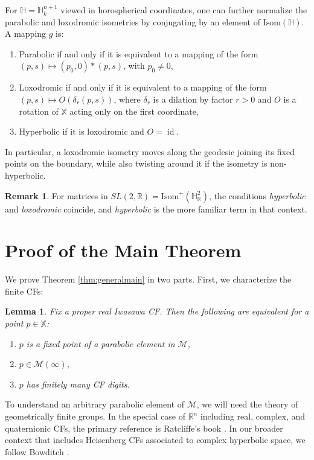 \documentclass[reqno,10pt]{amsart}
\newcommand{\Hyp}{\mathbb{H}}
\newcommand{\R}{\mathbb{R}}
\newcommand{\id}{\operatorname{id}}
\newcommand{\X}{\mathbb X}
\newcommand{\Isom}{\text{Isom}}
\newtheorem{lemma}[thm]{Lemma}
\numberwithin{thm}{section}
\theoremstyle{definition}
\theoremstyle{definition}
\newtheorem{remark}[thm]{Remark}
\numberwithin{equation}{section}
\newcommand{\Mod}{\mathcal M}
\begin{document}
For $\Hyp=\Hyp^{n+1}_k$ viewed in horospherical coordinates, one  can further normalize the parabolic and loxodromic isometries by conjugating by an element of $\Isom(\Hyp)$. A mapping $g$ is:
\begin{enumerate}
\item Parabolic if and only if it is equivalent to a mapping of the form $(p,s)\mapsto (p_0,0)*(p,s)$, with $p_0\neq 0$,
\item Loxodromic if and only if it is equivalent to a mapping of the form $(p,s)\mapsto O(\delta_r(p,s))$, where $\delta_r$ is a dilation by factor $r>0$ and $O$ is a rotation of $\X$ acting only on the first coordinate,
\item Hyperbolic if it is loxodromic and $O=\id$.
\end{enumerate}
In particular, a loxodromic isometry moves along the geodesic joining its fixed points on the boundary, while also twisting around it if the isometry is non-hyperbolic.


\begin{remark}
\label{remark:loxodromic}
For matrices in $SL(2,\R)=\Isom^+(\Hyp^2_\R)$, the conditions \emph{hyperbolic} and \emph{loxodromic} coincide, and \emph{hyperbolic} is the more familiar term in that context.
\end{remark}

\section{Proof of the Main Theorem}
\label{sec:mainproof}
We prove Theorem \ref{thm:generalmain} in two parts. First, we characterize the finite CFs:
\begin{lemma}
\label{lemma:rationalPoints}
Fix a proper real Iwasawa CF. Then the following are equivalent for a point $p\in \X$:
\begin{enumerate}
\item $p$ is a fixed point of a parabolic element in $\Mod$, 
\item $p\in \Mod(\infty)$,
\item $p$ has finitely many CF digits.
\end{enumerate}
\end{lemma}

To understand an arbitrary parabolic element of $\Mod$, we will need the theory of geometrically finite groups. In the special case of $\R^n$ including real, complex, and quaternionic CFs, the primary reference is Ratcliffe's book \cite{Ratcliffe}. In our broader context that includes Heisenberg CFs associated to complex hyperbolic space, we follow Bowditch \cite{Bowditch}.
\end{document}
